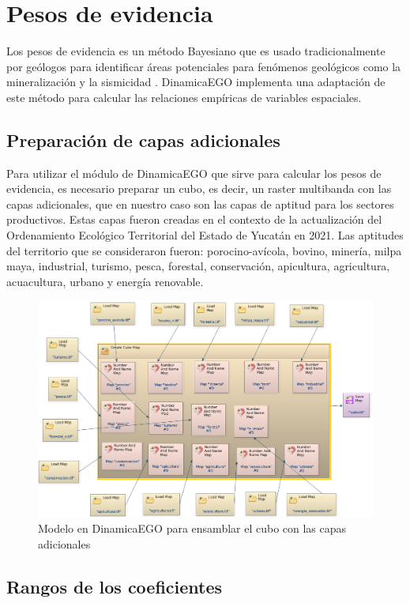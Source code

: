 \documentclass[12pt,a4paper,oldfontcommands]{article}
\begin{document}
\section{Pesos de evidencia}

Los pesos de evidencia es un método Bayesiano que es usado tradicionalmente por geólogos para identificar áreas potenciales para fenómenos geológicos como la mineralización y la sismicidad \parencite{agterberg_1992}. DinamicaEGO implementa una adaptación de este método para calcular las relaciones empíricas de variables espaciales.

\subsection{Preparación de capas adicionales}
Para utilizar el módulo de DinamicaEGO que sirve para calcular los pesos de evidencia, es necesario preparar un cubo, es decir, un raster multibanda con las capas adicionales, que en nuestro caso son las capas de aptitud para los sectores productivos. Estas capas fueron creadas en el contexto de la actualización del Ordenamiento Ecológico Territorial del Estado de Yucatán en 2021. Las aptitudes del territorio que se consideraron fueron: porocino-avícola, bovino, minería, milpa maya, industrial, turismo, pesca, forestal, conservación, apicultura, agricultura, acuacultura, urbano y energía renovable.
\bigskip
\begin{figure}[H]
	\centering
	\includegraphics[width=1\textwidth]{./figuras/cubo.png}
	\caption{Modelo en DinamicaEGO para ensamblar el cubo con las capas adicionales}
	\label{fig:cubo}
\end{figure}

 
\subsection{Rangos de los coeficientes}
\end{document}

